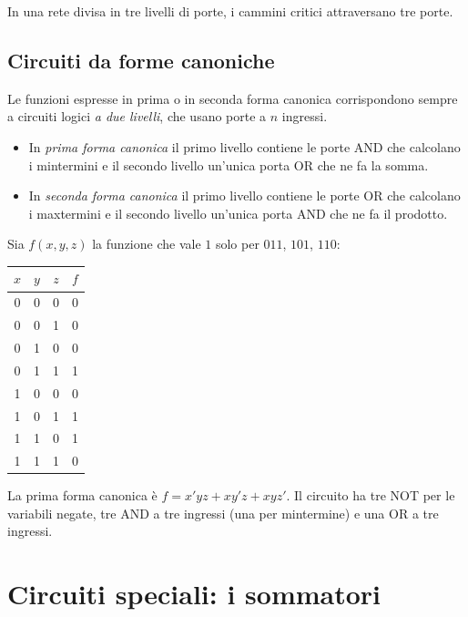 \documentclass[11pt,a4paper]{article}
\begin{document}
\begin{esempio}
In una rete divisa in tre livelli di porte, i cammini critici attraversano tre porte.
\end{esempio}

\subsection{Circuiti da forme canoniche}

Le funzioni espresse in prima o in seconda forma canonica corrispondono sempre a circuiti logici \emph{a due livelli}, che usano porte a $n$ ingressi.
\begin{itemize}
    \item In \emph{prima forma canonica} il primo livello contiene le porte AND che calcolano i mintermini e il secondo livello un'unica porta OR che ne fa la somma.
    \item In \emph{seconda forma canonica} il primo livello contiene le porte OR che calcolano i maxtermini e il secondo livello un'unica porta AND che ne fa il prodotto.
\end{itemize}

\begin{esempio}
Sia $f(x,y,z)$ la funzione che vale $1$ solo per $011$, $101$, $110$:
\begin{center}
\begin{tabular}{ccc|c}
\toprule
$x$ & $y$ & $z$ & $f$ \\
\midrule
0 & 0 & 0 & 0 \\
0 & 0 & 1 & 0 \\
0 & 1 & 0 & 0 \\
0 & 1 & 1 & 1 \\
1 & 0 & 0 & 0 \\
1 & 0 & 1 & 1 \\
1 & 1 & 0 & 1 \\
1 & 1 & 1 & 0 \\
\bottomrule
\end{tabular}
\end{center}
La prima forma canonica è $f = x'yz + xy'z + xyz'$. Il circuito ha tre NOT per le variabili negate, tre AND a tre ingressi (una per mintermine) e una OR a tre ingressi.
\end{esempio}

\section{Circuiti speciali: i sommatori}
\end{document}
